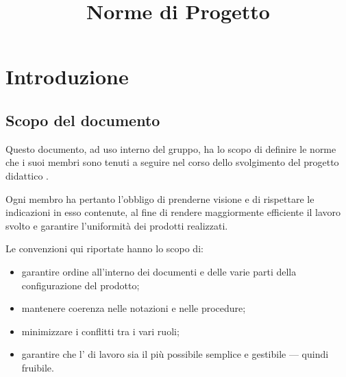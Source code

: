 


\author{\LB}
\supervisor{\GG}
\dest{\ALL}
\title{Norme di Progetto}


\maketitle

\tableofcontents






\section{Introduzione}

\subsection{Scopo del documento}
Questo documento, ad uso interno del gruppo, ha lo scopo di definire le norme che i suoi membri sono tenuti a seguire nel corso dello svolgimento del progetto didattico \proj.

Ogni membro ha pertanto l'obbligo di prenderne visione e di rispettare le indicazioni in esso contenute, al fine di rendere maggiormente efficiente il lavoro svolto e garantire l'uniformità dei prodotti realizzati.

Le convenzioni qui riportate hanno lo scopo di:
\begin{itemize}
	\item garantire ordine all'interno dei documenti e delle varie parti della configurazione del prodotto;
	\item mantenere coerenza nelle notazioni e nelle procedure;
	\item minimizzare i conflitti tra i vari ruoli;
	\item garantire che l' di lavoro sia il più possibile semplice e gestibile --- quindi fruibile.
\end{itemize}

